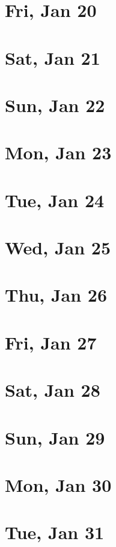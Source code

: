	\section{Fri, Jan 20}
		
	\section{Sat, Jan 21}
		
	\section{Sun, Jan 22}
		
	\section{Mon, Jan 23}
		
	\section{Tue, Jan 24}
		
	\section{Wed, Jan 25}
		
	\section{Thu, Jan 26}
		
	\section{Fri, Jan 27}
		
	\section{Sat, Jan 28}
		
	\section{Sun, Jan 29}
		
	\section{Mon, Jan 30}
		
	\section{Tue, Jan 31}
		
